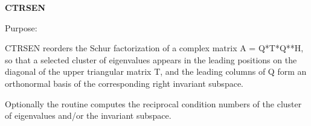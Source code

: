 {\bfseries C\+T\+R\+S\+E\+N} 

 \begin{DoxyParagraph}{Purpose\+: }
\begin{DoxyVerb} CTRSEN reorders the Schur factorization of a complex matrix
 A = Q*T*Q**H, so that a selected cluster of eigenvalues appears in
 the leading positions on the diagonal of the upper triangular matrix
 T, and the leading columns of Q form an orthonormal basis of the
 corresponding right invariant subspace.

 Optionally the routine computes the reciprocal condition numbers of
 the cluster of eigenvalues and/or the invariant subspace.\end{DoxyVerb}
 
\end{DoxyParagraph}

